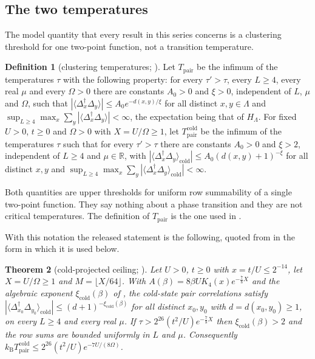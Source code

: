 \documentclass[11pt]{article}
\newtheorem{theorem}{Theorem}[section]
\theoremstyle{definition}
\newtheorem{definition}[theorem]{Definition}
\theoremstyle{remark}
\newcommand{\R}{\mathbb{R}}
\newcommand{\Tpair}{T_{\mathrm{pair}}}
\newcommand{\Tcold}{T_{\mathrm{pair}}^{\mathrm{cold}}}
\newcommand{\Dop}{\Delta}
\newcommand{\cold}{\mathrm{cold}}
\begin{document}
\subsection{The two temperatures}

The model quantity that every result in this series concerns is a clustering
threshold for one two-point function, not a transition temperature.

\begin{definition}[clustering temperatures; \cite{largeu}]
\label{def:tpair}
Let $\Tpair$ be the infimum of the temperatures $\tau$ with the following
property: for every $\tau'>\tau$, every $L\ge4$, every real $\mu$ and every
$\Omega>0$ there are constants $A_{0}>0$ and $\xi>0$, independent of $L$, $\mu$
and $\Omega$, such that
$|\langle\Dop_{x}^{\dagger}\Dop_{y}\rangle|\le A_{0}e^{-d(x,y)/\xi}$ for all
distinct $x,y\in\Lambda$ and
$\sup_{L\ge4}\max_{x}\sum_{y}|\langle\Dop_{x}^{\dagger}\Dop_{y}\rangle|<\infty$,
the expectation being that of $H_{\Lambda}$. For fixed $U>0$, $t\ge0$ and
$\Omega>0$ with $X=U/\Omega\ge1$, let $\Tcold$ be the infimum of the temperatures
$\tau$ such that for every $\tau'>\tau$ there are constants $A_{0}>0$ and
$\xi>2$, independent of $L\ge4$ and $\mu\in\R$, with
$|\langle\Dop_{x}^{\dagger}\Dop_{y}\rangle_{\cold}|\le A_{0}(d(x,y)+1)^{-\xi}$
for all distinct $x,y$ and
$\sup_{L\ge4}\max_{x}\sum_{y}|\langle\Dop_{x}^{\dagger}\Dop_{y}\rangle_{\cold}|<\infty$.
\end{definition}

Both quantities are upper thresholds for uniform row summability of a single
two-point function. They say nothing about a phase transition and they are not
critical temperatures. The definition of $\Tpair$ is the one used in
\cite{largeu,strong}.

With this notation the released statement is the following, quoted from
\cite{largeu} in the form in which it is used below.

\begin{theorem}[cold-projected ceiling; \cite{largeu}]
\label{thm:cold}
Let $U>0$, $t\ge0$ with $x=t/U\le2^{-14}$, let $X=U/\Omega\ge1$ and
$M=\lfloor X/64\rfloor$. With $A(\beta)=8\beta U K_{4}(x)e^{-\frac78X}$ and the
algebraic exponent $\xi_{\cold}(\beta)$ of \cite{largeu}, the cold-state pair
correlations satisfy
$|\langle\Dop_{x_{0}}^{\dagger}\Dop_{y_{0}}\rangle_{\cold}|\le(d+1)^{-\xi_{\cold}(\beta)}$
for all distinct $x_{0},y_{0}$ with $d=d(x_{0},y_{0})\ge1$, on every $L\ge4$ and
every real $\mu$. If $\tau>2^{26}(t^{2}/U)e^{-\frac78X}$ then
$\xi_{\cold}(\beta)>2$ and the row sums are bounded uniformly in $L$ and $\mu$.
Consequently $k_{\mathrm{B}}\Tcold\le2^{26}(t^{2}/U)e^{-7U/(8\Omega)}$.
\end{theorem}
\end{document}

